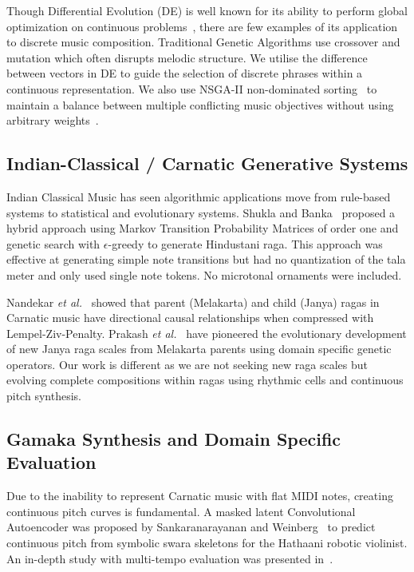 \documentclass[conference,letterpaper]{IEEEtran}
\newcounter{algorithm}
\begin{document}
Though Differential Evolution (DE) is well known for its ability to perform global optimization on continuous problems~\cite{storn1997}, there are few examples of its application to discrete music composition. Traditional Genetic Algorithms use crossover and mutation which often disrupts melodic structure. We utilise the difference between vectors in DE to guide the selection of discrete phrases within a continuous representation. We also use NSGA-II non-dominated sorting~\cite{deb2002} to maintain a balance between multiple conflicting music objectives without using arbitrary weights~\cite{zitzler2003}.

\subsection{Indian-Classical / Carnatic Generative Systems}
Indian Classical Music has seen algorithmic applications move from rule-based systems to statistical and evolutionary systems. Shukla and Banka~\cite{shukla2023} proposed a hybrid approach using Markov Transition Probability Matrices of order one and genetic search with $\epsilon$-greedy to generate Hindustani raga. This approach was effective at generating simple note transitions but had no quantization of the tala meter and only used single note tokens. No microtonal ornaments were included.

Nandekar \textit{et al.}~\cite{nandekar2021} showed that parent (Melakarta) and child (Janya) ragas in Carnatic music have directional causal relationships when compressed with Lempel-Ziv-Penalty. Prakash \textit{et al.}~\cite{prakash2026} have pioneered the evolutionary development of new Janya raga scales from Melakarta parents using domain specific genetic operators. Our work is different as we are not seeking new raga scales but evolving complete compositions within ragas using rhythmic cells and continuous pitch synthesis.

\subsection{Gamaka Synthesis and Domain Specific Evaluation}
Due to the inability to represent Carnatic music with flat MIDI notes, creating continuous pitch curves is fundamental. A masked latent Convolutional Autoencoder was proposed by Sankaranarayanan and Weinberg~\cite{gamaka2022} to predict continuous pitch from symbolic swara skeletons for the Hathaani robotic violinist. An in-depth study with multi-tempo evaluation was presented in~\cite{gamaka2025}.
\end{document}
